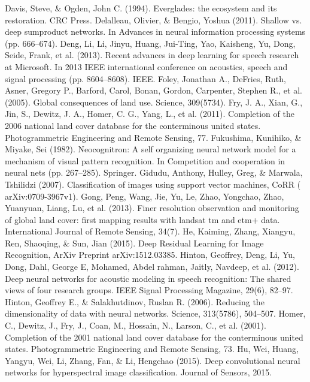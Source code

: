 \documentclass[letterpaper, 10 pt, conference]{ieeeconf}  %
\begin{document}
\begin{thebibliography}{99}
Davis, Steve, \& Ogden, John C. (1994). Everglades: the ecosystem and its restoration. CRC Press.
Delalleau, Olivier, \& Bengio, Yoshua (2011). Shallow vs. deep sumproduct networks. In Advances in neural information processing systems (pp. 666–674). Deng, Li, Li, Jinyu, Huang, Jui-Ting, Yao, Kaisheng, Yu, Dong, Seide, Frank, et al.
(2013). Recent advances in deep learning for speech research at Microsoft. In 2013 IEEE international conference on acoustics, speech and signal processing (pp. 8604–8608). IEEE.
Foley, Jonathan A., DeFries, Ruth, Asner, Gregory P., Barford, Carol, Bonan, Gordon, Carpenter, Stephen R., et al. (2005). Global consequences of land use. Science, 309(5734).
Fry, J. A., Xian, G., Jin, S., Dewitz, J. A., Homer, C. G., Yang, L., et al. (2011). Completion of the 2006 national land cover database for the conterminous united states. Photogrammetric Engineering and Remote Sensing, 77.
Fukushima, Kunihiko, \& Miyake, Sei (1982). Neocognitron: A self organizing neural network model for a mechanism of visual pattern recognition. In Competition and cooperation in neural nets (pp. 267–285). Springer.
Gidudu, Anthony, Hulley, Greg, \& Marwala, Tshilidzi (2007). Classification of images using support vector machines, CoRR ( arXiv:0709-3967v1).
Gong, Peng, Wang, Jie, Yu, Le, Zhao, Yongchao, Zhao, Yuanyuan, Liang, Lu, et al. (2013). Finer resolution observation and monitoring of global land cover: first mapping results with landsat tm and etm+ data. International Journal of Remote Sensing, 34(7).
He, Kaiming, Zhang, Xiangyu, Ren, Shaoqing, \& Sun, Jian (2015). Deep Residual Learning for Image Recognition, ArXiv Preprint arXiv:1512.03385.
Hinton, Geoffrey, Deng, Li, Yu, Dong, Dahl, George E, Mohamed, Abdel rahman, Jaitly, Navdeep, et al. (2012). Deep neural networks for acoustic modeling in speech recognition: The shared views of four research groups. IEEE Signal Processing Magazine, 29(6), 82–97.
Hinton, Geoffrey E., \& Salakhutdinov, Ruslan R. (2006). Reducing the dimensionality of data with neural networks. Science, 313(5786), 504–507.
Homer, C., Dewitz, J., Fry, J., Coan, M., Hossain, N., Larson, C., et al. (2001). Completion of the 2001 national land cover database for the conterminous united states. Photogrammetric Engineering and Remote Sensing, 73.
Hu, Wei, Huang, Yangyu, Wei, Li, Zhang, Fan, \& Li, Hengchao (2015). Deep convolutional neural networks for hyperspectral image classification. Journal of Sensors, 2015.

\end{thebibliography}
\end{document}
